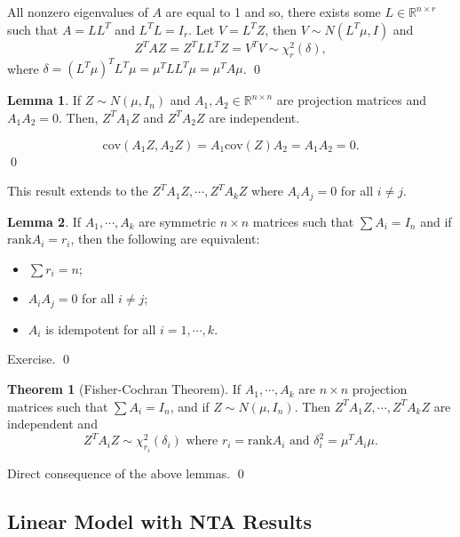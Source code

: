 \documentclass[
]{article}
\theoremstyle{definition}
\newtheorem{theorem}{Theorem}
\theoremstyle{definition}
\newtheorem{lemma}{Lemma}[section]
\begin{document}
All nonzero eigenvalues of \(A\) are equal to 1 and so, there exists
some \(L \in \mathbb{R}^{n \times r}\) such that \(A = LL^T\) and
\(L^T L = I_r\). Let \(V = L^T Z\), then \(V \sim N(L^T \mu, I)\) and
\[Z^T A Z = Z^T LL^T Z = V^T V \sim \chi_r^2(\delta),\] where
\(\delta = (L^T \mu)^T L^T \mu = \mu^T LL^T \mu = \mu^T A \mu\). \qed

\begin{lemma}
  If \(Z \sim N(\mu, I_n)\) and \(A_1, A_2 \in \mathbb{R}^{n \times n}\) are projection 
  matrices and \(A_1A_2 = 0\). Then, \(Z^TA_1 Z\) and \(Z^TA_2 Z\) are independent.
\end{lemma}
\proof

\[\text{cov}(A_1 Z, A_2 Z) = A_1 \text{cov}(Z) A_2 = A_1 A_2 = 0.\] \qed

This result extends to the \(Z^T A_1 Z, \cdots, Z^T A_k Z\) where
\(A_i A_j = 0\) for all \(i \neq j\).

\begin{lemma}
  If \(A_1, \cdots, A_k\) are symmetric \(n \times n\) matrices such that \(\sum A_i = I_n\) 
  and if \(\text{rank} A_i = r_i\), then the following are equivalent:
  \begin{itemize}
    \item \(\sum r_i = n\);
    \item \(A_i A_j = 0\) for all \(i \neq j\);
    \item \(A_i\) is idempotent for all \(i = 1, \cdots, k\).
  \end{itemize}
\end{lemma}
\proof

Exercise. \qed

\begin{theorem}[Fisher-Cochran Theorem]
  If \(A_1, \cdots, A_k\) are \(n \times n\) projection matrices such that 
  \(\sum A_i = I_n\), and if \(Z \sim N(\mu, I_n)\). Then \(Z^T A_1 Z, \cdots, Z^T A_k Z\)
  are independent and 
  \[Z^T A_i Z \sim \chi_{r_i}^2(\delta_i) \text{ where } r_i = \text{rank} A_i \text{ and } 
  \delta_i^2 = \mu^T A_i \mu.\]
\end{theorem}
\proof

Direct consequence of the above lemmas. \qed

\hypertarget{linear-model-with-nta-results}{%
\subsection{Linear Model with NTA
Results}\label{linear-model-with-nta-results}}
\end{document}
